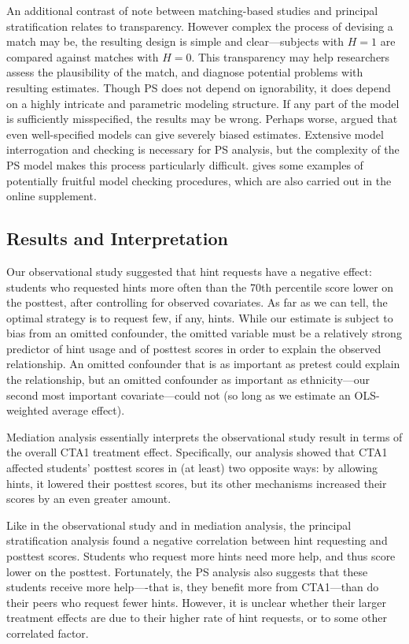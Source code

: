 \documentclass{article}\usepackage[]{graphicx}\usepackage[]{color}
\begin{document}
An additional contrast of note between matching-based studies and
principal stratification relates to transparency.
However complex the process of devising a match may be, the resulting
design is simple and clear---subjects with $H=1$ are compared against
matches with $H=0$.
This transparency may help researchers assess the plausibility of the
match, and diagnose potential problems with resulting estimates.
Though PS does not depend on ignorability, it does depend on a highly
intricate and parametric modeling structure.
If any part of the model is sufficiently misspecified, the results may
be wrong.
Perhaps worse, \citet{feller2016principal} argued that even well-specified
models can give severely biased estimates.
Extensive model interrogation and checking is necessary for PS
analysis, but the complexity of the PS model makes this process
particularly difficult.
\citet{aoas} gives some examples of potentially fruitful model
checking procedures, which are also carried out in the online supplement.

\subsection{Results and Interpretation}

Our observational study suggested that hint requests have a negative effect: students who
requested hints more often than the 70th
percentile score lower on the posttest, after controlling for observed
covariates.
As far as we can tell, the optimal strategy is to request few, if any, hints.
While our estimate is subject to bias from an omitted confounder, the omitted variable must be a relatively strong predictor of hint usage and of posttest scores in order to explain the observed relationship.
An omitted confounder that is as important as pretest could explain the relationship, but an omitted confounder as important as ethnicity---our second most important covariate---could not (so long as we estimate an OLS-weighted average effect).

Mediation analysis essentially interprets the observational study result in terms of the
overall CTA1 treatment effect.
Specifically, our analysis showed that CTA1 affected students'
posttest scores in (at least) two opposite ways: by allowing hints, it
lowered their posttest scores, but its other mechanisms increased
their scores by an even greater amount.

Like in the observational study and in mediation analysis, the
principal stratification analysis found a negative correlation
between hint requesting and posttest scores.
Students who request more hints need more help, and thus score lower
on the posttest.
Fortunately, the PS analysis also suggests that these students
receive more help----that is, they benefit more from CTA1---than do their peers who request fewer hints.
However, it is unclear whether their larger treatment effects are due to their higher rate of hint requests, or to some other correlated factor.
\end{document}
